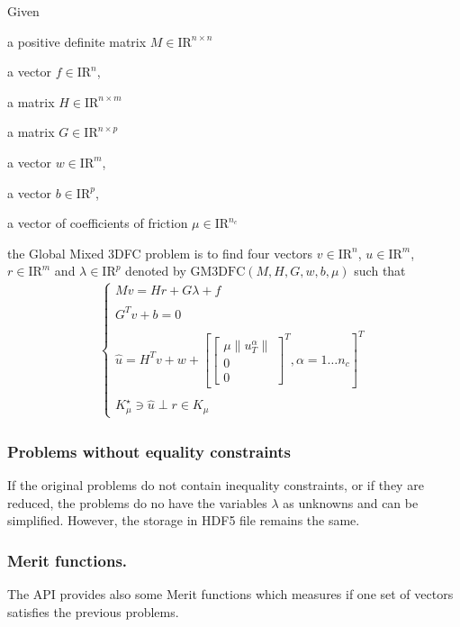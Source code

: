 Given 
\begin{DoxyItemize}
\item a positive definite matrix ${M} \in {\mathrm{I\!R}}^{n \times n}$ 
\item a vector $ {f} \in {\mathrm{I\!R}}^n$, 
\item a matrix ${H} \in {\mathrm{I\!R}}^{n \times m}$ 
\item a matrix ${G} \in {\mathrm{I\!R}}^{n \times p}$ 
\item a vector $w \in {\mathrm{I\!R}}^{m}$, 
\item a vector $b \in {\mathrm{I\!R}}^{p}$, 
\item a vector of coefficients of friction $\mu \in {\mathrm{I\!R}}^{n_c}$ 
\end{DoxyItemize}the Global Mixed 3\+D\+FC problem is to find four vectors $ {v} \in {\mathrm{I\!R}}^n$, $u\in{\mathrm{I\!R}}^m$, $r\in {\mathrm{I\!R}}^m$ and $\lambda \in {\mathrm{I\!R}}^p$ denoted by $\mathrm{GM3DFC}(M,H,G,w,b,\mu)$ such that \begin{eqnarray*} \begin{cases} M v = {H} {r} + G\lambda + {f} \\ \\ G^T v +b =0 \\ \\ \hat u = H^T v + w +\left[ \left[\begin{array}{c} \mu \|u^\alpha_T\|\\ 0 \\ 0 \end{array}\right]^T, \alpha = 1 \ldots n_c \right]^T \\ \\ K^\star_{\mu} \ni {\hat u} \perp r \in K_{\mu} \end{cases} \end{eqnarray*} \hypertarget{index_without}{}\subsubsection{Problems without equality constraints}\label{index_without}
If the original problems do not contain inequality constraints, or if they are reduced, the problems do no have the variables $\lambda$ as unknowns and can be simplified. However, the storage in H\+D\+F5 file remains the same.\hypertarget{index_merit}{}\subsubsection{Merit functions.}\label{index_merit}
The A\+PI provides also some Merit functions which measures if one set of vectors satisfies the previous problems. 